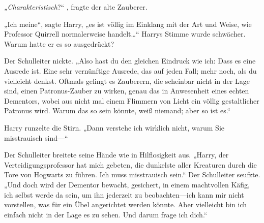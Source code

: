 \emph{„Charakteristisch}?“ , fragte der alte Zauberer.

„Ich meine“, sagte Harry, „es ist völlig im Einklang mit der Art und Weise, wie Professor Quirrell normalerweise handelt…“ Harrys Stimme wurde schwächer. Warum hatte er es so ausgedrückt?

Der Schulleiter nickte. „Also hast du den gleichen Eindruck wie ich: Dass es eine Ausrede ist. Eine sehr vernünftige Ausrede, das auf jeden Fall; mehr noch, als du vielleicht denkst. Oftmals gelingt es Zauberern, die scheinbar nicht in der Lage sind, einen Patronus-Zauber zu wirken, genau das in Anwesenheit eines echten Dementors, wobei aus nicht mal einem Flimmern von Licht ein völlig gestaltlicher Patronus wird. Warum das so sein könnte, weiß niemand; aber so ist es.“

Harry runzelte die Stirn. „Dann verstehe ich wirklich nicht, warum Sie misstrauisch sind—“

Der Schulleiter breitete seine Hände wie in Hilflosigkeit aus. „Harry, der Verteidigungsprofessor hat mich gebeten, die dunkelste aller Kreaturen durch die Tore von Hogwarts zu führen. Ich muss misstrauisch sein.“ Der Schulleiter seufzte. „Und doch wird der Dementor bewacht, gesichert, in einem machtvollen Käfig, ich selbst werde da sein, um ihn jederzeit zu beobachten—ich kann mir nicht vorstellen, was für ein Übel angerichtet werden könnte. Aber vielleicht bin ich einfach nicht in der Lage es zu sehen. Und darum frage ich dich.“

